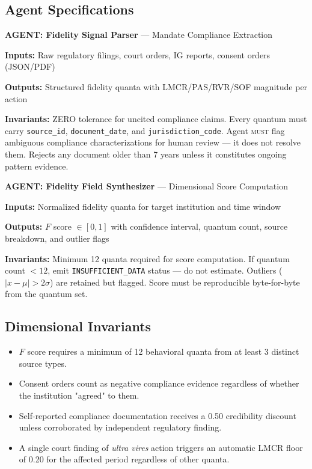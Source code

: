\documentclass[a4paper,11pt]{article}
\begin{document}
	\subsection{Agent Specifications}
	
	\begin{agentbox}
		\textbf{\sffamily\color{navy} AGENT: Fidelity Signal Parser} — Mandate Compliance Extraction
		
		\medskip
		\textbf{Inputs:} Raw regulatory filings, court orders, IG reports, consent orders (JSON/PDF)
		
		\textbf{Outputs:} Structured fidelity quanta with LMCR/PAS/RVR/SOF magnitude per action
		
		\textbf{Invariants:} ZERO tolerance for uncited compliance claims. Every quantum must carry \texttt{source\_id}, \texttt{document\_date}, and \texttt{jurisdiction\_code}. Agent \textsc{must} flag ambiguous compliance characterizations for human review — it does not resolve them. Rejects any document older than 7 years unless it constitutes ongoing pattern evidence.
	\end{agentbox}
	
	\medskip
	
	\begin{agentbox}
		\textbf{\sffamily\color{navy} AGENT: Fidelity Field Synthesizer} — Dimensional Score Computation
		
		\medskip
		\textbf{Inputs:} Normalized fidelity quanta for target institution and time window
		
		\textbf{Outputs:} $F$ score $\in [0,1]$ with confidence interval, quantum count, source breakdown, and outlier flags
		
		\textbf{Invariants:} Minimum 12 quanta required for score computation. If quantum count $< 12$, emit \texttt{INSUFFICIENT\_DATA} status — do not estimate. Outliers ($|x - \mu| > 2\sigma$) are retained but flagged. Score must be reproducible byte-for-byte from the quantum set.
	\end{agentbox}
	
	\subsection{Dimensional Invariants}
	
	\begin{itemize}[leftmargin=1.5em]
		\item $F$ score requires a minimum of 12 behavioral quanta from at least 3 distinct source types.
		\item Consent orders count as negative compliance evidence regardless of whether the institution "agreed" to them.
		\item Self-reported compliance documentation receives a 0.50 credibility discount unless corroborated by independent regulatory finding.
		\item A single court finding of \emph{ultra vires} action triggers an automatic LMCR floor of 0.20 for the affected period regardless of other quanta.
	\end{itemize}
	
\end{document}
